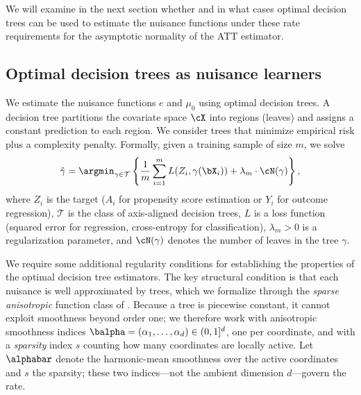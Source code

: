 \documentclass[12pt]{article}
\begin{document}
We will examine in the next section whether and in what cases optimal decision trees can be used to estimate the nuisance functions under these rate requirements for the asymptotic normality of the ATT estimator. 

\subsection{Optimal decision trees as nuisance learners}

We estimate the nuisance functions $e$ and $\mu_0$ using optimal decision trees. A decision tree partitions the covariate space $\cX$ into regions (leaves) and assigns a constant prediction to each region. We consider trees that minimize empirical risk plus a complexity penalty. Formally, given a training sample of size $m$, we solve
\begin{equation}
\label{eq:tree-optimization}
\hat{\gamma} = \argmin_{\gamma \in \mathcal{T}} \left\{ \frac{1}{m} \sum_{i=1}^m L(Z_i, \gamma(\bX_i)) + \lambda_m \cdot \cN(\gamma) \right\},
\end{equation}
where $Z_i$ is the target ($A_i$ for propensity score estimation or $Y_i$ for outcome regression), $\mathcal{T}$ is the class of axis-aligned decision trees, $L$ is a loss function (squared error for regression, cross-entropy for classification), $\lambda_m > 0$ is a regularization parameter, and $\cN(\gamma)$ denotes the number of leaves in the tree $\gamma$.

We require some additional regularity conditions for establishing the properties of the optimal decision tree estimators. The key structural condition is that each nuisance is well approximated by trees, which we formalize through the \emph{sparse anisotropic} function class of \citet{xuStatisticalOptimalityOptimal2026}. Because a tree is piecewise constant, it cannot exploit smoothness beyond order one; we therefore work with anisotropic smoothness indices $\balpha = (\alpha_1, \dots, \alpha_d) \in (0,1]^d$, one per coordinate, and with a \emph{sparsity} index $s$ counting how many coordinates are locally active. Let $\alphabar$ denote the harmonic-mean smoothness over the active coordinates and $s$ the sparsity; these two indices---not the ambient dimension $d$---govern the rate.
\end{document}
